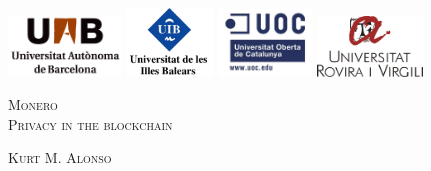 \documentclass[a4paper,11pt,english,oneside,onecolumn,final,openany]{report}
\begin{document}

\pagestyle{plain}
\thispagestyle{empty}

\mbox{}
\vspace{1cm}
\begin{center}
  \includegraphics[width=3cm]{front/figures/logo_uab.jpg}
  \hspace{0.5cm}
  \includegraphics[width=2.3cm]{front/figures/logo_uib.jpg}
  \hspace{0.5cm}
  \includegraphics[width=2.5cm]{front/figures/logo_uoc.jpg}
  \hspace{0.5cm}
  \includegraphics[width=2.8cm]{front/figures/logo_urv.jpg}
\end{center}


\vfill{}
{\par\centering \textsc{\LARGE Monero \\Privacy in the blockchain}\par}
\bigskip
{\par\centering \textsc{\large Kurt M. Alonso }\par} %
\vfill{}

\begin{center}
  \begin{minipage}[t]{0.8\columnwidth}
 
  
  
  \end{minipage}
\end{center}
\end{document}
